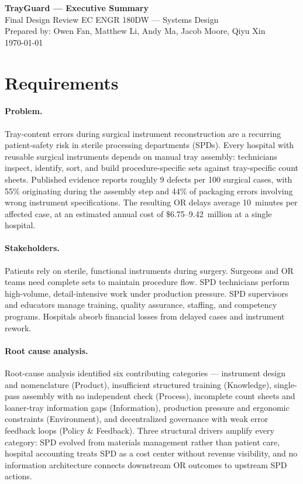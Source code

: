 \documentclass[10pt]{article}
\begin{document}
\begin{center}
{\Large\bfseries TrayGuard --- Executive Summary}\\[4pt]
{\small Final Design Review \hfill EC ENGR 180DW --- Systems Design}\\[2pt]
{\small Prepared by: Owen Fan, Matthew Li, Andy Ma, Jacob Moore, Qiyu Xin}\\[2pt]
{\small \today}
\end{center}

\section*{Requirements}

\paragraph{Problem.}
Tray-content errors during surgical instrument reconstruction are a recurring
patient-safety risk in sterile processing departments (SPDs). Every hospital
with reusable surgical instruments depends on manual tray assembly: technicians
inspect, identify, sort, and build procedure-specific sets against tray-specific
count sheets. Published evidence reports roughly 9 defects per 100 surgical
cases, with 55\% originating during the assembly step and 44\% of packaging
errors involving wrong instrument specifications. The resulting OR delays
average 10~minutes per affected case, at an estimated annual cost of
\$6.75--9.42~million at a single hospital.

\paragraph{Stakeholders.}
Patients rely on sterile, functional instruments during surgery. Surgeons and OR
teams need complete sets to maintain procedure flow. SPD technicians perform
high-volume, detail-intensive work under production pressure. SPD supervisors
and educators manage training, quality assurance, staffing, and competency
programs. Hospitals absorb financial losses from delayed cases and instrument
rework.

\paragraph{Root cause analysis.}
Root-cause analysis identified six contributing categories --- instrument
design and nomenclature (Product), insufficient structured training
(Knowledge), single-pass assembly with no independent check (Process),
incomplete count sheets and loaner-tray information gaps (Information),
production pressure and ergonomic constraints (Environment), and decentralized
governance with weak error feedback loops (Policy \& Feedback). Three
structural drivers amplify every category: SPD evolved from materials
management rather than patient care, hospital accounting treats SPD as a cost
center without revenue visibility, and no information architecture connects
downstream OR outcomes to upstream SPD actions.
\end{document}
